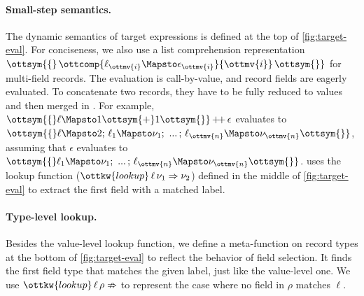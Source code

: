 \paragraph{Small-step semantics.}
The dynamic semantics of target expressions is defined at the top of
\autoref{fig:target-eval}. For conciseness, we also use a list comprehension
representation $\ottsym{\{} \, \ottcomp{\ell_{\ottmv{i}}  \Mapsto  \epsilon_{\ottmv{i}}}{\ottmv{i}} \, \ottsym{\}}$ for multi-field records. The
evaluation is call-by-value, and record fields are eagerly evaluated. To
concatenate two records, they have to be fully reduced to values and then merged
in . For example, $\ottsym{\{}  \ell  \Mapsto  1  \ottsym{+}  1  \ottsym{\}}  \,{+}\!{+}\,  \epsilon$ evaluates to
$\ottsym{\{}  \ell  \Mapsto  2  ; \,  \ell_{{\mathrm{1}}}  \Mapsto  \nu_{{\mathrm{1}}}  ; \, \, ... \, ; \,  \ell_{\ottmv{n}}  \Mapsto  \nu_{\ottmv{n}}  \ottsym{\}}$, assuming that $\epsilon$
evaluates to $\ottsym{\{}  \ell_{{\mathrm{1}}}  \Mapsto  \nu_{{\mathrm{1}}}  ; \, \, ... \, ; \,  \ell_{\ottmv{n}}  \Mapsto  \nu_{\ottmv{n}}  \ottsym{\}}$. 
uses the lookup function ($\ottkw{lookup} \, \ell \, \nu_{{\mathrm{1}}}  \Rightarrow  \nu_{{\mathrm{2}}}$) defined in the middle of
\autoref{fig:target-eval} to extract the first field with a matched label.

\paragraph{Type-level lookup.}
Besides the value-level lookup function, we define a meta-function on record
types at the bottom of \autoref{fig:target-eval} to reflect the behavior of
field selection. It finds the first field type that matches the given label,
just like the value-level one. We use $\ottkw{lookup} \, \ell \, \rho  \nRightarrow$ to represent the
case where no field in $\rho$ matches $\ell$.

